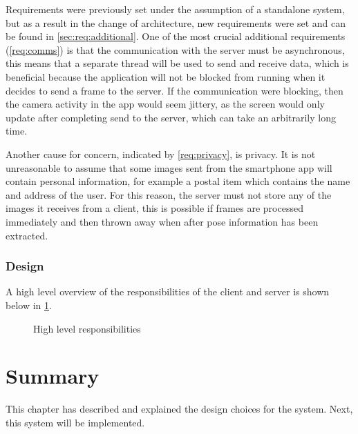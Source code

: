 Requirements were previously set under the assumption of a standalone system, but as a result in the change of architecture, new requirements were set and can be found in \cref{sec:req:additional}. One of the most crucial additional requirements (\cref{req:comms}) is that the communication with the server must be asynchronous, this means that a separate thread will be used to send and receive data, which is beneficial because the application will not be blocked from running when it decides to send a frame to the server. If the communication were blocking, then the camera activity in the app would seem jittery, as the screen would only update after completing send to the server, which can take an arbitrarily long time.

Another cause for concern, indicated by \cref{req:privacy}, is privacy. It is not unreasonable to assume that some images sent from the smartphone app will contain personal information, for example a postal item which contains the name and address of the user. For this reason, the server must not store any of the images it receives from a client, this is possible if frames are processed immediately and then thrown away when after pose information has been extracted.

\subsubsection{Design}

A high level overview of the responsibilities of the client and server is shown below in \cref{fig:clientserverarch}.

\begin{figure}[ht]
    \centering
    \begin{minipage}{.45\textwidth}
    \end{minipage}\hfill
    \begin{minipage}{.45\textwidth}
    \end{minipage}
\caption{High level responsibilities}
\label{fig:clientserverarch}
\end{figure}

\section{Summary}

This chapter has described and explained the design choices for the system. Next, this system will be implemented.